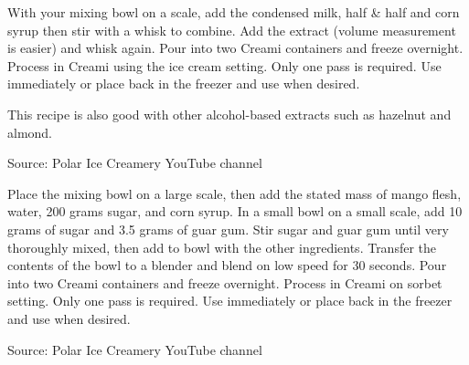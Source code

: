 \documentclass[letterpaper]{recipePMG}
\begin{document}
\newpage
{}



With your mixing bowl on a scale, add the condensed milk, half \& half and corn syrup then stir with a whisk to combine.  Add the extract (volume measurement is easier) and whisk again.  Pour into two Creami containers and freeze overnight. Process in Creami using the ice cream setting.  Only one pass is required.  Use immediately or place back in the freezer and use when desired.

This recipe is also good with other alcohol-based extracts such as hazelnut and almond.

Source: Polar Ice Creamery YouTube channel




Place the mixing bowl on a large scale, then add the stated mass of mango flesh, water, 200 grams sugar, and corn syrup.  In a small bowl on a small scale, add 10 grams of sugar and 3.5 grams of guar gum.  Stir sugar and guar gum until very thoroughly mixed, then add to bowl with the other ingredients. Transfer the contents of the bowl to a blender and blend on low speed for 30 seconds.  Pour into two Creami containers and freeze overnight.  Process in Creami on sorbet setting.  Only one pass is required.  Use immediately or place back in the freezer and use when desired.

Source: Polar Ice Creamery YouTube channel
\newpage



\end{document}
